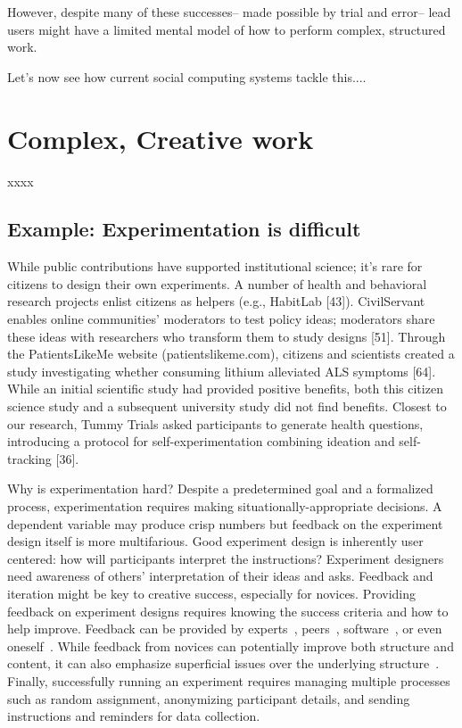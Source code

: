 However, despite many of these successes-- made possible by trial and error-- lead users might have 
a limited mental model of how to perform complex, structured work. 

Let's now see how  current social computing systems tackle this.... 

\section{Complex, Creative work}

xxxx

\subsection {Example: Experimentation is difficult}
While public contributions have supported institutional science; it’s rare for citizens to design
their own experiments. A number of health and behavioral research projects enlist citizens as helpers (e.g., HabitLab [43]). 
CivilServant enables online communities’ 
moderators to test policy ideas; moderators share these ideas with researchers who transform 
them to study designs [51]. Through the PatientsLikeMe website (patientslikeme.com), citizens 
and scientists created a study investigating whether consuming lithium alleviated ALS symptoms [64]. 
While an initial scientific study had provided positive benefits, both this citizen science study and 
a subsequent university study did not find benefits. Closest to our research, Tummy Trials asked 
participants to generate health questions, introducing a protocol for self-experimentation 
combining ideation and self-tracking [36].

Why is experimentation hard?  Despite a predetermined goal and a formalized process, experimentation
requires making situationally-appropriate decisions. A dependent variable may produce crisp
numbers but feedback on the experiment design itself is more multifarious. Good experiment
design is inherently user centered: how will participants interpret the instructions? Experiment
designers need awareness of others’ interpretation of their ideas and asks. Feedback and iteration
might be key to creative success, especially for novices. Providing feedback on experiment
designs requires knowing the success criteria and how to
help improve.  Feedback can be provided by experts~\cite{dow2012shepherding, schon1984reflective}, peers~\cite{Boud1995, Kulkarni2015b}, software~\cite{Dantoni2015, Head2017}, or even oneself~\cite{Boud1995,schon1984reflective}. While feedback from novices can
potentially improve both structure and content, it can also emphasize superficial issues over the
underlying structure~\cite{chi1981expertise}. Finally, successfully running an experiment
requires managing multiple processes such as random
assignment, anonymizing participant details, and sending
instructions and reminders for data collection.

